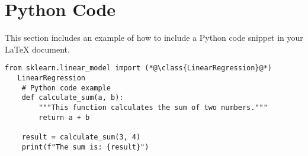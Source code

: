 \section{Python Code}
\label{sec:python_code}

This section includes an example of how to include a Python code snippet in your LaTeX document.

\begin{lstlisting}[caption=Python Example, label=lst:python_code]
from sklearn.linear_model import (*@\class{LinearRegression}@*)
   LinearRegression 
    # Python code example
    def calculate_sum(a, b):
        """This function calculates the sum of two numbers."""
        return a + b
    
    result = calculate_sum(3, 4)
    print(f"The sum is: {result}")
\end{lstlisting}